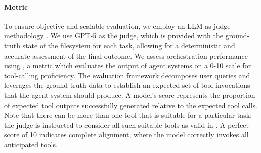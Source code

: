 \paragraph{Metric}
To ensure objective and scalable evaluation, we employ an LLM-as-judge methodology \cite{zheng2023judging}. We use GPT-5 as the judge, which is provided with the ground-truth state of the filesystem for each task, allowing for a deterministic and accurate assessment of the final outcome.
We assess orchestration performance using \emph{\judgemetric}, a metric which evaluates the output of agent systems on a 0-10 scale for tool-calling proficiency. The evaluation framework decomposes user queries and leverages the ground-truth data to establish an expected set of tool invocations that the agent system should produce. A model's score represents the proportion of expected tool outputs successfully generated relative to the expected tool calls. Note that there can be more than one tool that is suitable for a particular task; the judge is instructed to consider all such suitable tools as valid in . 
A perfect score of 10 indicates complete alignment, where the model correctly invokes all anticipated tools.



